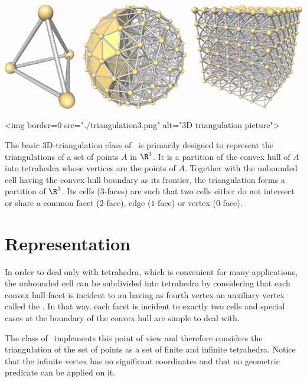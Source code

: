 %

\begin{ccTexOnly}
\begin{center}
\includegraphics[width=15cm]{Triangulation_3/triangulation3}
\end{center}
\end{ccTexOnly}
\begin{ccHtmlOnly}
<img border=0 src="./triangulation3.png" alt="3D triangulation picture">
\end{ccHtmlOnly}

The basic 3D-triangulation class of \cgal\ is primarily designed to
represent the triangulations of a set of points $A$ in $\R^3$.  It is
a partition of the convex hull of {$A$} into tetrahedra whose vertices
are the points of {$A$}.  Together with the unbounded cell having the
convex hull boundary as its frontier, the triangulation forms a
partition of $\R^3$. Its cells ($3$-faces) are such that two cells
either do not intersect or share a common facet ($2$-face), edge
($1$-face) or vertex ($0$-face).

\section{Representation\label{Triangulation3-sec-intro}}

In order to deal
only with tetrahedra, which is convenient for many applications, the
unbounded cell can be subdivided into tetrahedra by considering that
each convex hull facet is incident to an  having as
fourth vertex an auxiliary vertex called the .  In
that way, each facet is incident to exactly two cells and special cases
at the boundary of the convex hull are simple to deal with.

The class  of \cgal\ implements this
point of view and therefore considers the triangulation of the set
of points as a set of finite and infinite tetrahedra.  Notice that the
infinite vertex has no significant coordinates and that no
geometric predicate can be applied on it.

